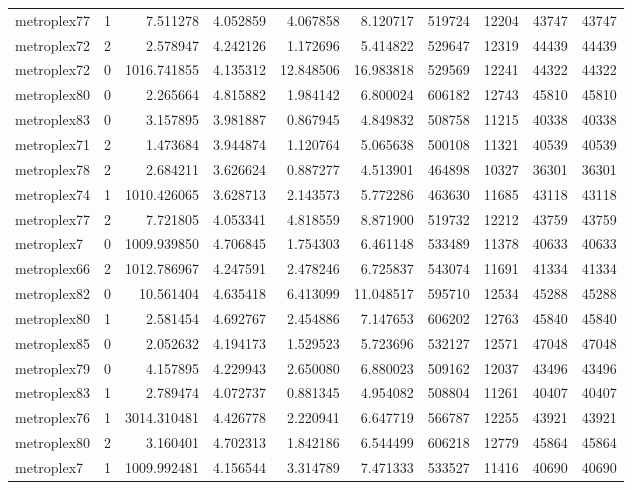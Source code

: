 \documentclass[../../../thesis.tex]{subfiles}
\begin{document}
\begin{longtable}{|l|r|r|r|r|r|r|r|r|r|}
metroplex77 & 1 & 7.511278 & 4.052859 & 4.067858 & 8.120717 & 519724 & 12204 & 43747 & 43747 \\
metroplex72 & 2 & 2.578947 & 4.242126 & 1.172696 & 5.414822 & 529647 & 12319 & 44439 & 44439 \\
metroplex72 & 0 & 1016.741855 & 4.135312 & 12.848506 & 16.983818 & 529569 & 12241 & 44322 & 44322 \\
metroplex80 & 0 & 2.265664 & 4.815882 & 1.984142 & 6.800024 & 606182 & 12743 & 45810 & 45810 \\
metroplex83 & 0 & 3.157895 & 3.981887 & 0.867945 & 4.849832 & 508758 & 11215 & 40338 & 40338 \\
metroplex71 & 2 & 1.473684 & 3.944874 & 1.120764 & 5.065638 & 500108 & 11321 & 40539 & 40539 \\
metroplex78 & 2 & 2.684211 & 3.626624 & 0.887277 & 4.513901 & 464898 & 10327 & 36301 & 36301 \\
metroplex74 & 1 & 1010.426065 & 3.628713 & 2.143573 & 5.772286 & 463630 & 11685 & 43118 & 43118 \\
metroplex77 & 2 & 7.721805 & 4.053341 & 4.818559 & 8.871900 & 519732 & 12212 & 43759 & 43759 \\
metroplex7 & 0 & 1009.939850 & 4.706845 & 1.754303 & 6.461148 & 533489 & 11378 & 40633 & 40633 \\
metroplex66 & 2 & 1012.786967 & 4.247591 & 2.478246 & 6.725837 & 543074 & 11691 & 41334 & 41334 \\
metroplex82 & 0 & 10.561404 & 4.635418 & 6.413099 & 11.048517 & 595710 & 12534 & 45288 & 45288 \\
metroplex80 & 1 & 2.581454 & 4.692767 & 2.454886 & 7.147653 & 606202 & 12763 & 45840 & 45840 \\
metroplex85 & 0 & 2.052632 & 4.194173 & 1.529523 & 5.723696 & 532127 & 12571 & 47048 & 47048 \\
metroplex79 & 0 & 4.157895 & 4.229943 & 2.650080 & 6.880023 & 509162 & 12037 & 43496 & 43496 \\
metroplex83 & 1 & 2.789474 & 4.072737 & 0.881345 & 4.954082 & 508804 & 11261 & 40407 & 40407 \\
metroplex76 & 1 & 3014.310481 & 4.426778 & 2.220941 & 6.647719 & 566787 & 12255 & 43921 & 43921 \\
metroplex80 & 2 & 3.160401 & 4.702313 & 1.842186 & 6.544499 & 606218 & 12779 & 45864 & 45864 \\
metroplex7 & 1 & 1009.992481 & 4.156544 & 3.314789 & 7.471333 & 533527 & 11416 & 40690 & 40690 \\

\end{longtable}
\end{document}
